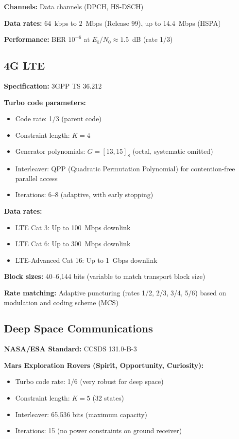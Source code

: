 \textbf{Channels:} Data channels (DPCH, HS-DSCH)

\textbf{Data rates:} 64~kbps to 2~Mbps (Release 99), up to 14.4~Mbps (HSPA)

\textbf{Performance:} BER $10^{-6}$ at $E_b/N_0 \approx 1.5$~dB (rate 1/3)

\subsection{4G LTE}

\textbf{Specification:} 3GPP TS 36.212

\textbf{Turbo code parameters:}
\begin{itemize}
\item Code rate: 1/3 (parent code)
\item Constraint length: $K = 4$
\item Generator polynomials: $G = [13, 15]_8$ (octal, systematic omitted)
\item Interleaver: QPP (Quadratic Permutation Polynomial) for contention-free parallel access
\item Iterations: 6--8 (adaptive, with early stopping)
\end{itemize}

\textbf{Data rates:}
\begin{itemize}
\item LTE Cat 3: Up to 100~Mbps downlink
\item LTE Cat 6: Up to 300~Mbps downlink
\item LTE-Advanced Cat 16: Up to 1~Gbps downlink
\end{itemize}

\textbf{Block sizes:} 40--6,144 bits (variable to match transport block size)

\textbf{Rate matching:} Adaptive puncturing (rates 1/2, 2/3, 3/4, 5/6) based on modulation and coding scheme (MCS)

\subsection{Deep Space Communications}

\textbf{NASA/ESA Standard:} CCSDS 131.0-B-3

\textbf{Mars Exploration Rovers (Spirit, Opportunity, Curiosity):}
\begin{itemize}
\item Turbo code rate: 1/6 (very robust for deep space)
\item Constraint length: $K = 5$ (32 states)
\item Interleaver: 65,536 bits (maximum capacity)
\item Iterations: 15 (no power constraints on ground receiver)
\end{itemize}

